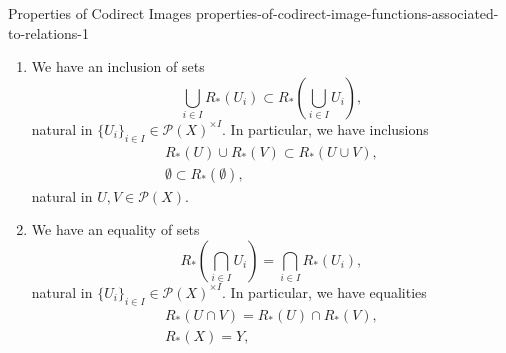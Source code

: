 \begin{proposition}{Properties of Codirect Images \rmI}{properties-of-codirect-image-functions-associated-to-relations-1}
\begin{enumerate}
\[\begin{tikzcd}[row sep={5.0*\the\DL,between origins}, column sep={12.0*\the\DL,between origins}, background color=backgroundColor, ampersand replacement=\&]
                    \arrow[r,"R^{\op}_{!}\times R_{*}"]
                    \arrow[d,"{[-_{1},-_{2}]_{Y}}"']
                    \&
                    {\mathcal{P}(X)^{\op}\times\mathcal{P}(X)}
                    \arrow[d,"{[-_{1},-_{2}]_{X}}"]
                    \\
                    {\mathcal{P}(Y)}
                    \arrow[r,"R_{*}"']
                    \&
                    \mathcal{P}(X)
                    \arrow[from=1-2,to=2-1,"\scalebox{1.5}{$\supset$}"{sloped,description},phantom,shorten <= 0.5*\the\DL,shorten >= 0.625*\the\DL,Rightarrow,pos=0.5]%
                \end{tikzcd}
            \]%
            with components
            \[
                [R_{!}(U),R_{*}(V)]_{X}%
                \subset%
                R_{*}([U,V]_{Y}),%
            \]%
            indexed by $U,V\in\mathcal{P}(Y)$.
        \item\label{properties-of-codirect-image-functions-associated-to-relations-1-lax-preservation-of-colimits}We have an inclusion of sets
            \[
                \bigcup_{i\in I}R_{*}(U_{i})%
                \subset%
                R_{*}\left(\bigcup_{i\in I}U_{i}\right),%
            \]%
            natural in $\{U_{i}\}_{i\in I}\in\mathcal{P}(X)^{\times I}$. In particular, we have inclusions%
            \[
                \begin{gathered}
                    R_{*}(U)\cup R_{*}(V) \subset R_{*}(U\cup V),\\
                    \emptyset             \subset R_{*}(\emptyset),
                \end{gathered}
            \]%
            natural in $U,V\in\mathcal{P}(X)$.
        \item\label{properties-of-codirect-image-functions-associated-to-relations-1-preservation-of-limits}We have an equality of sets
            \[
                R_{*}\left(\bigcap_{i\in I}U_{i}\right)%
                =%
                \bigcap_{i\in I}R_{*}(U_{i}),%
            \]%
            natural in $\{U_{i}\}_{i\in I}\in\mathcal{P}(X)^{\times I}$. In particular, we have equalities%
            \[
                \begin{gathered}
                    R_{*}(U\cap V) = R_{*}(U)\cap R_{*}(V),\\
                    R_{*}(X)       = Y,
                \end{gathered}
\]
\end{enumerate}
\end{proposition}
